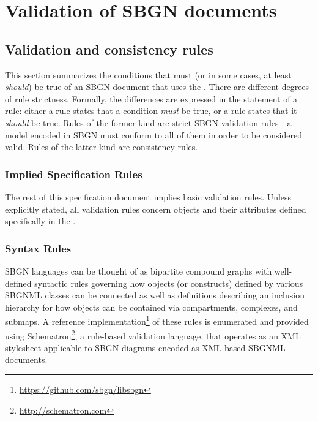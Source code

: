 
\section{Validation of SBGN documents}
\label{apdx-validation-small}

\subsection{Validation and consistency rules}
\label{validation-rules}

This section summarizes the conditions that must (or in some cases,
at least \emph{should}) be true of an SBGN document that
uses the \SystemsBiologyGraphicalNotationMarkupLanguagePackage. There are different degrees of rule strictness. Formally, the differences are expressed in the statement of a rule: either a rule states that a condition \emph{must} be true, or a rule states that it \emph{should} be true. Rules of the former kind are strict SBGN validation rules---a model encoded in SBGN must conform to all of them in order to be considered valid. Rules of the latter kind are consistency rules. 

\subsubsection{Implied Specification Rules}

The rest of this specification document implies basic validation rules. Unless explicitly stated, all validation rules concern objects and their attributes defined specifically in the \SystemsBiologyGraphicalNotationMarkupLanguagePackage.

\subsubsection{Syntax Rules}

SBGN languages can be thought of as bipartite compound graphs with well-defined syntactic rules governing how objects (or constructs) defined by various SBGNML classes can be connected as well as definitions describing an inclusion hierarchy for how objects can be contained via compartments, complexes, and submaps. A reference implementation\footnote{\url{https://github.com/sbgn/libsbgn}} of these rules is enumerated and provided using Schematron\footnote{\url{http://schematron.com}}, a rule-based validation language, that operates as an XML stylesheet applicable to SBGN diagrams encoded as XML-based SBGNML documents. 

